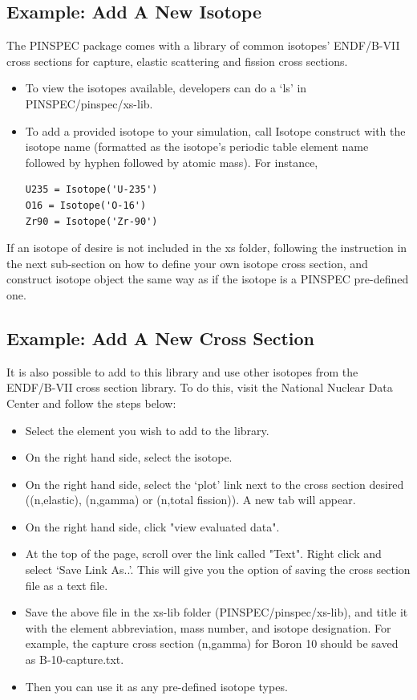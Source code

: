 \documentclass[titlepage]{article}
\begin{document}
\subsection{Example: Add A New Isotope}
The PINSPEC package comes with a library of common isotopes' ENDF/B-VII cross sections for capture, elastic scattering and fission cross sections. 
\begin{itemize}
\item To view the isotopes available, developers can do a `ls' in PINSPEC/pinspec/xs-lib. 
\item To add a provided isotope to your simulation, call Isotope construct with the isotope name (formatted as the isotope's periodic table element name followed by hyphen followed by atomic mass). For instance, 
\begin{verbatim}
U235 = Isotope('U-235')
O16 = Isotope('O-16')
Zr90 = Isotope('Zr-90')
\end{verbatim}
\end{itemize}
If an isotope of desire is not included in the xs folder, following the instruction in the next sub-section on how to define your own isotope cross section, and construct isotope object the same way as if the isotope is a PINSPEC pre-defined one.


\clearpage
\subsection{Example: Add A New Cross Section}
It is also possible to add to this library and use other isotopes from the ENDF/B-VII cross section library. To do this, visit the National Nuclear Data Center and follow the steps below:
\begin{itemize}
\item Select the element you wish to add to the library.
\item On the right hand side, select the isotope.
\item On the right hand side, select the `plot' link next to the cross section desired ((n,elastic), (n,gamma) or (n,total fission)). A new tab will appear.
\item On the right hand side, click "view evaluated data".
\item At the top of the page, scroll over the link called "Text". Right click and select `Save Link As..'. This will give you the option of saving the cross section file as a text file.

\item Save the above file in the xs-lib folder (PINSPEC/pinspec/xs-lib), and title it with the element abbreviation, mass number, and isotope designation. For example, the capture cross section (n,gamma) for Boron 10 should be saved as B-10-capture.txt. 

\item Then you can use it as any pre-defined isotope types. 
\end{itemize}
\end{document}
